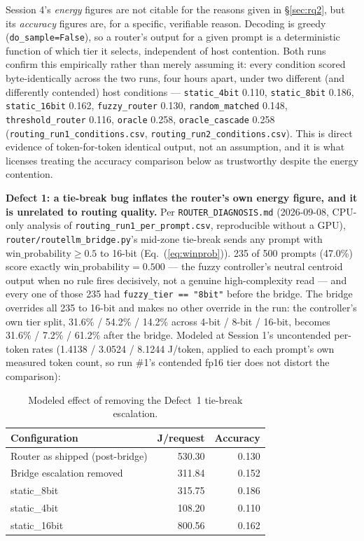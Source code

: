 \documentclass[conference]{IEEEtran}
\begin{document}
Session 4's \emph{energy} figures are not citable for the reasons given
in \S\ref{sec:rq2}, but its \emph{accuracy} figures are, for a specific,
verifiable reason. Decoding is greedy (\texttt{do\_sample=False}), so a
router's output for a given prompt is a deterministic function of which
tier it selects, independent of host contention. Both runs confirm this
empirically rather than merely assuming it: every condition scored
byte-identically across the two runs, four hours apart, under two
different (and differently contended) host conditions ---
\texttt{static\_4bit} 0.110, \texttt{static\_8bit} 0.186,
\texttt{static\_16bit} 0.162, \texttt{fuzzy\_router} 0.130,
\texttt{random\_matched} 0.148, \texttt{threshold\_router} 0.116,
\texttt{oracle} 0.258, \texttt{oracle\_cascade} 0.258
(\texttt{routing\_run1\_conditions.csv}, \texttt{routing\_run2\_conditions.csv}).
This is direct evidence of token-for-token identical output, not an
assumption, and it is what licenses treating the accuracy comparison
below as trustworthy despite the energy contention.

\textbf{Defect 1: a tie-break bug inflates the router's own energy
figure, and it is unrelated to routing quality.} Per
\texttt{ROUTER\_DIAGNOSIS.md} (2026-09-08, CPU-only analysis of
\texttt{routing\_run1\_per\_prompt.csv}, reproducible without a GPU),
\texttt{router/routellm\_bridge.py}'s mid-zone tie-break sends any prompt
with $\text{win\_probability} \ge 0.5$ to 16-bit (Eq.~(\ref{eq:winprob})).
235 of 500 prompts (47.0\%) score exactly $\text{win\_probability} =
0.500$ --- the fuzzy controller's neutral centroid output when no rule
fires decisively, not a genuine high-complexity read --- and every one of
those 235 had \texttt{fuzzy\_tier == "8bit"} before the bridge. The
bridge overrides all 235 to 16-bit and makes no other override in the
run: the controller's own tier split, 31.6\% / 54.2\% / 14.2\% across
4-bit / 8-bit / 16-bit, becomes 31.6\% / 7.2\% / 61.2\% after the bridge.
Modeled at Session 1's uncontended per-token rates (1.4138 / 3.0524 /
8.1244 J/token, applied to each prompt's own measured token count, so run
\#1's contended fp16 tier does not distort the comparison):

\begin{table}[h]
\caption{Modeled effect of removing the Defect~1 tie-break escalation.}
\label{tab:defect1}
\centering
\begin{tabular}{@{}lrr@{}}
\toprule
Configuration & J/request & Accuracy \\
\midrule
Router as shipped (post-bridge) & 530.30 & 0.130 \\
Bridge escalation removed        & 311.84 & 0.152 \\
static\_8bit                     & 315.75 & 0.186 \\
static\_4bit                     & 108.20 & 0.110 \\
static\_16bit                    & 800.56 & 0.162 \\
\bottomrule
\end{tabular}
\end{table}
\end{document}

